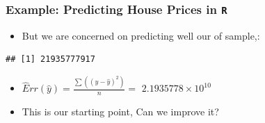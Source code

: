 \documentclass[
  shownotes,
  xcolor={svgnames},
  hyperref={colorlinks,citecolor=DarkBlue,linkcolor=DarkRed,urlcolor=DarkBlue}
  , aspectratio=169]{beamer}
\newenvironment{Shaded}{\begin{snugshade}}{\end{snugshade}}
\newcommand{\DataTypeTok}[1]{\textcolor[rgb]{0.13,0.29,0.53}{#1}}
\newcommand{\DecValTok}[1]{\textcolor[rgb]{0.00,0.00,0.81}{#1}}
\newcommand{\KeywordTok}[1]{\textcolor[rgb]{0.13,0.29,0.53}{\textbf{#1}}}
\newcommand{\NormalTok}[1]{#1}
\newcommand{\OperatorTok}[1]{\textcolor[rgb]{0.81,0.36,0.00}{\textbf{#1}}}
\begin{document}
\begin{frame}[fragile]
\frametitle{Example: Predicting House Prices in \texttt{R}}

\begin{itemize}
  \item But we are concerned on predicting well our of sample,:
\end{itemize}
\bigskip
\begin{Shaded}
\footnotesize
{}
\end{Shaded}

\begin{tiny}
\begin{verbatim}
## [1] 21935777917
\end{verbatim}
\end{tiny}

\begin{itemize}
  \item $\hat Err(\hat y)=\frac{\sum((y-\hat{y})^2)}{n}=$ \ensuremath{2.1935778\times 10^{10}}
  \item This is our starting point, Can we improve it?
\end{itemize}
  
\end{frame}

\end{document}
